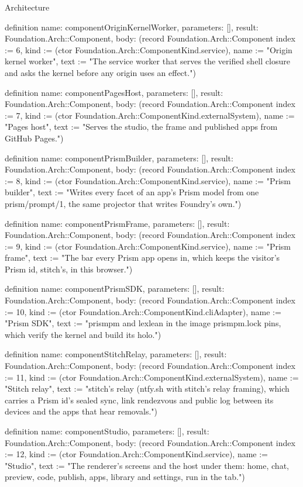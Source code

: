 \begin{lexlean}{Architecture}
\begin{semanticmodule}
definition{
  name: componentOriginKernelWorker,
  parameters: [],
  result: Foundation.Arch::Component,
  body: (record Foundation.Arch::Component {index := 6, kind := (ctor Foundation.Arch::ComponentKind.service), name := "Origin kernel worker", text := "The service worker that serves the verified shell closure and asks the kernel before any origin uses an effect."})
}

definition{
  name: componentPagesHost,
  parameters: [],
  result: Foundation.Arch::Component,
  body: (record Foundation.Arch::Component {index := 7, kind := (ctor Foundation.Arch::ComponentKind.externalSystem), name := "Pages host", text := "Serves the studio, the frame and published apps from GitHub Pages."})
}

definition{
  name: componentPrismBuilder,
  parameters: [],
  result: Foundation.Arch::Component,
  body: (record Foundation.Arch::Component {index := 8, kind := (ctor Foundation.Arch::ComponentKind.service), name := "Prism builder", text := "Writes every facet of an app's Prism model from one prism/prompt/1, the same projector that writes Foundry's own."})
}

definition{
  name: componentPrismFrame,
  parameters: [],
  result: Foundation.Arch::Component,
  body: (record Foundation.Arch::Component {index := 9, kind := (ctor Foundation.Arch::ComponentKind.service), name := "Prism frame", text := "The bar every Prism app opens in, which keeps the visitor's Prism id, stitch's, in this browser."})
}

definition{
  name: componentPrismSDK,
  parameters: [],
  result: Foundation.Arch::Component,
  body: (record Foundation.Arch::Component {index := 10, kind := (ctor Foundation.Arch::ComponentKind.cliAdapter), name := "Prism SDK", text := "prismpm and lexlean in the image prismpm.lock pins, which verify the kernel and build its holo."})
}

definition{
  name: componentStitchRelay,
  parameters: [],
  result: Foundation.Arch::Component,
  body: (record Foundation.Arch::Component {index := 11, kind := (ctor Foundation.Arch::ComponentKind.externalSystem), name := "Stitch relay", text := "stitch's relay (ntfy.sh with stitch's relay framing), which carries a Prism id's sealed sync, link rendezvous and public log between its devices and the apps that hear removals."})
}

definition{
  name: componentStudio,
  parameters: [],
  result: Foundation.Arch::Component,
  body: (record Foundation.Arch::Component {index := 12, kind := (ctor Foundation.Arch::ComponentKind.service), name := "Studio", text := "The renderer's screens and the host under them: home, chat, preview, code, publish, apps, library and settings, run in the tab."})
}


\end{semanticmodule}
\end{lexlean}
